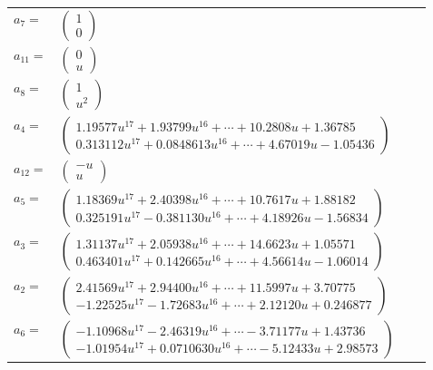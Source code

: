\documentclass[1p]{elsarticle_modified}
\theoremstyle{definition}
\begin{document}
\begin{tabular}{m{7pt} m{180pt} m{7pt} m{180pt} }
\flushright $a_{7}=$&$\begin{pmatrix}1\\0\end{pmatrix}$ \\
\flushright $a_{11}=$&$\begin{pmatrix}0\\u\end{pmatrix}$ \\
\flushright $a_{8}=$&$\begin{pmatrix}1\\u^2\end{pmatrix}$ \\
\flushright $a_{4}=$&$\begin{pmatrix}1.19577 u^{17}+1.93799 u^{16}+\cdots+10.2808 u+1.36785\\0.313112 u^{17}+0.0848613 u^{16}+\cdots+4.67019 u-1.05436\end{pmatrix}$ \\
\flushright $a_{12}=$&$\begin{pmatrix}- u\\u\end{pmatrix}$ \\
\flushright $a_{5}=$&$\begin{pmatrix}1.18369 u^{17}+2.40398 u^{16}+\cdots+10.7617 u+1.88182\\0.325191 u^{17}-0.381130 u^{16}+\cdots+4.18926 u-1.56834\end{pmatrix}$ \\
\flushright $a_{3}=$&$\begin{pmatrix}1.31137 u^{17}+2.05938 u^{16}+\cdots+14.6623 u+1.05571\\0.463401 u^{17}+0.142665 u^{16}+\cdots+4.56614 u-1.06014\end{pmatrix}$ \\
\flushright $a_{2}=$&$\begin{pmatrix}2.41569 u^{17}+2.94400 u^{16}+\cdots+11.5997 u+3.70775\\-1.22525 u^{17}-1.72683 u^{16}+\cdots+2.12120 u+0.246877\end{pmatrix}$ \\
\flushright $a_{6}=$&$\begin{pmatrix}-1.10968 u^{17}-2.46319 u^{16}+\cdots-3.71177 u+1.43736\\-1.01954 u^{17}+0.0710630 u^{16}+\cdots-5.12433 u+2.98573\end{pmatrix}$ \\

\end{tabular}
\end{document}
